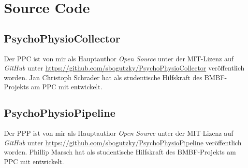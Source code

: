 \chapter{Source Code}
\section{PsychoPhysioCollector}
Der \ac{PPC} ist von mir als Hauptauthor \emph{Open Source} unter der MIT-Lizenz auf \emph{GitHub} unter \url{https://github.com/sbogutzky/PsychoPhysioCollector} veröffentlich worden. Jan Christoph Schrader hat als studentische Hilfskraft des \acs{BMBF}-Projekts am \ac{PPC} mit entwickelt. 

\section{PsychoPhysioPipeline}
Der \ac{PPP} ist von mir als Hauptauthor \emph{Open Source} unter der MIT-Lizenz auf \emph{GitHub} unter \url{https://github.com/sbogutzky/PsychoPhysioPipeline} veröffentlich worden. Phillip Marsch hat als studentische Hilfskraft des \acs{BMBF}-Projekts am \ac{PPC} mit entwickelt. 